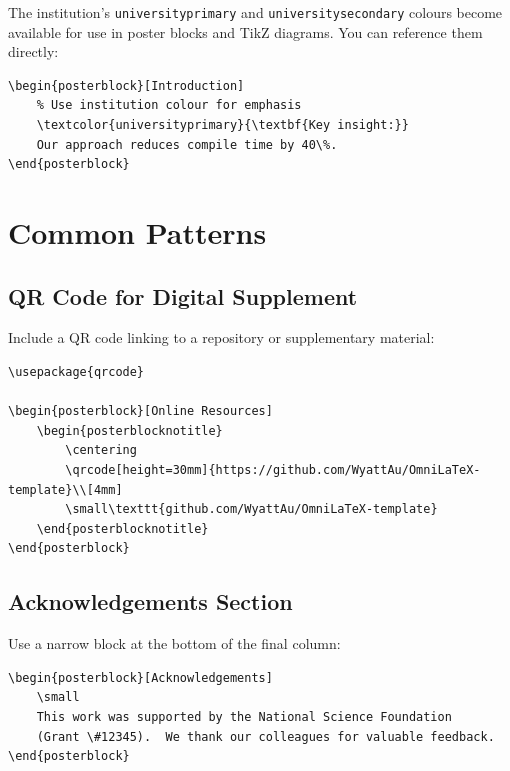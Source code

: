 The institution's \texttt{universityprimary} and \texttt{universitysecondary}
colours become available for use in poster blocks and TikZ diagrams.  You
can reference them directly:

\begin{verbatim}
\begin{posterblock}[Introduction]
    % Use institution colour for emphasis
    \textcolor{universityprimary}{\textbf{Key insight:}}
    Our approach reduces compile time by 40\%.
\end{posterblock}
\end{verbatim}

\section{Common Patterns}

\subsection{QR Code for Digital Supplement}

Include a QR code linking to a repository or supplementary material:

\begin{verbatim}
\usepackage{qrcode}

\begin{posterblock}[Online Resources]
    \begin{posterblocknotitle}
        \centering
        \qrcode[height=30mm]{https://github.com/WyattAu/OmniLaTeX-template}\\[4mm]
        \small\texttt{github.com/WyattAu/OmniLaTeX-template}
    \end{posterblocknotitle}
\end{posterblock}
\end{verbatim}

\subsection{Acknowledgements Section}

Use a narrow block at the bottom of the final column:

\begin{verbatim}
\begin{posterblock}[Acknowledgements]
    \small
    This work was supported by the National Science Foundation
    (Grant \#12345).  We thank our colleagues for valuable feedback.
\end{posterblock}
\end{verbatim}

